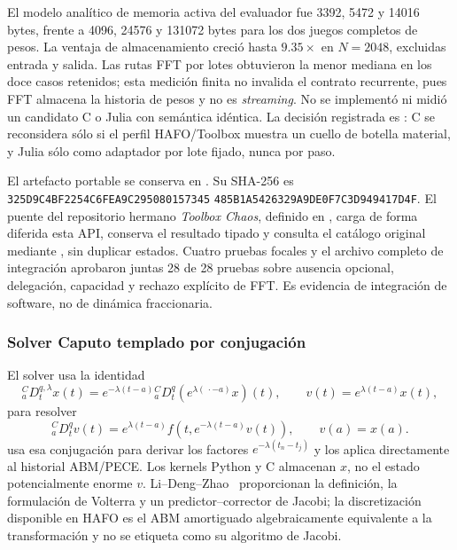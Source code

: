 El modelo analítico de memoria activa del evaluador fue 3392, 5472 y
14016 bytes, frente a 4096, 24576 y 131072 bytes para los dos juegos completos
de pesos. La ventaja de almacenamiento creció hasta \(9.35\times\) en
\(N=2048\), excluidas entrada y salida. Las rutas FFT por lotes obtuvieron la
menor mediana en los doce casos retenidos; esta medición finita no invalida el contrato
recurrente, pues FFT almacena la historia de pesos y no es \emph{streaming}.
No se implementó ni midió un candidato C o Julia con semántica idéntica. La
decisión registrada es
: C se reconsidera
sólo si el perfil HAFO/Toolbox muestra un cuello de botella material, y Julia
sólo como adaptador por lote fijado, nunca por paso.

El artefacto portable se conserva en
.
Su SHA-256 es
\texttt{325D9C4BF2254C6F}\allowbreak\texttt{EA9C295080157345}\allowbreak
\texttt{485B1A5426329A9D}\allowbreak\texttt{E0F7C3D949417D4F}.
El puente del repositorio hermano \emph{Toolbox Chaos}, definido en
, carga de forma diferida esta API, conserva
el resultado tipado y consulta el catálogo original mediante
, sin duplicar estados. Cuatro pruebas focales y
el archivo completo de integración aprobaron juntas 28 de 28 pruebas sobre
ausencia opcional, delegación, capacidad y rechazo explícito de FFT. Es evidencia de integración
de software, no de dinámica fraccionaria.

\subsubsection{Solver Caputo templado por conjugación}

El solver usa la identidad
\[
 {}_a^CD_t^{q,\lambda}x(t)=e^{-\lambda(t-a)}{}_a^CD_t^q
 \left(e^{\lambda(\,\cdot-a)}x\right)(t),
 \qquad v(t)=e^{\lambda(t-a)}x(t),
\]
para resolver
\[
 {}_a^CD_t^qv(t)=e^{\lambda(t-a)}
 f\!\left(t,e^{-\lambda(t-a)}v(t)\right),\qquad v(a)=x(a).
\]
 usa esa conjugación para derivar los
factores \(e^{-\lambda(t_n-t_j)}\) y los aplica directamente al historial
ABM/PECE. Los kernels Python y C almacenan \(x\), no el estado potencialmente
enorme \(v\).
Li--Deng--Zhao~\cite{LiDengZhao2019} proporcionan la definición, la formulación
de Volterra y un predictor--corrector de Jacobi; la discretización disponible
en HAFO es el ABM amortiguado algebraicamente equivalente a la transformación y
no se etiqueta como su algoritmo de Jacobi.

